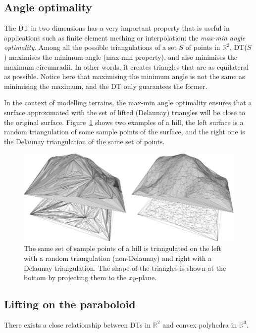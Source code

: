 %
\subsection{Angle optimality}
The DT in two dimensions has a very important property that is useful in applications such as finite element meshing or interpolation: the \emph{max-min angle optimality}. 
Among all the possible triangulations of a set $S$ of points in $\mathbb{R}^2$, DT($S$) maximises the minimum angle (max-min property), and also minimises the maximum circumradii. 
In other words, it creates triangles that are as equilateral as possible. 
Notice here that maximising the minimum angle is not the same as minimising the maximum, and the DT only guarantees the former.

%

In the context of modelling terrains, the max-min angle optimality ensures that a surface approximated with the set of lifted (Delaunay) triangles will be close to the original surface.
Figure~\ref{fig:notdelaunay} shows two examples of a hill, the left surface is a random triangulation of some sample points of the surface, and the right one is the Delaunay triangulation of the same set of points.
\begin{figure}
  \centering
  \includegraphics[width=0.9\linewidth]{notdelaunay/notdelaunay}
  \caption{The same set of sample points of a hill is triangulated on the left with a random triangulation (non-Delaunay) and right with a Delaunay triangulation. The shape of the triangles is shown at the bottom by projecting them to the $xy$-plane.}%
\label{fig:notdelaunay}
\end{figure}



\subsection{Lifting on the paraboloid}%
\label{sec:parabolic_lifting}

There exists a close relationship between DTs in $\mathbb{R}^{2}$ and convex polyhedra in $\mathbb{R}^{3}$. 

